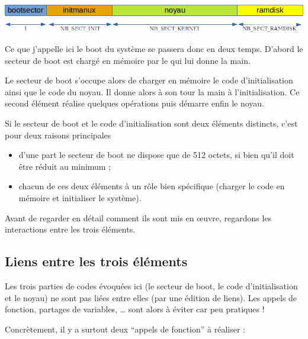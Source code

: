 \includegraphics{images/image-disquette.png}


   Ce que j'appelle ici le boot du système se passera donc en deux
temps. D'abord le secteur de boot est chargé en mémoire par le
\bios qui lui donne la main.

   Le secteur de boot  s'occupe alors de charger en mémoire le code
d'initialisation ainsi que le code du noyau. Il donne alors à son tour
la main à l'initialisation. Ce second élément réalise quelques
opérations puis démarre enfin le noyau.

   Si le secteur de boot et le code d'initialisation sont deux
éléments distincts, c'est pour deux raisons principales

\begin{itemize}
   \item d'une part le secteur de boot ne dispose que de 512 octets,
     si bien qu'il doit être réduit au  minimum ;
   \item chacun de ces deux éléments à un rôle bien spécifique
     (charger le code en mémoire et initialiser le système).
\end{itemize}

   Avant de regarder en détail comment ils sont mis en \oe{}uvre,
regardons les interactions entre les trois éléments.
   
%
\subsection{Liens entre les trois éléments}

   Les trois parties de codes évoquées ici (le secteur de boot, le
code d'initialisation et le noyau) ne sont pas liées entre elles (par
une édition de liens). Les appels de fonction, partages de variables,
\ldots {} sont alors à éviter car peu pratiques !

   Concrètement, il y a surtout deux ``appels de fonction'' à réaliser : 

